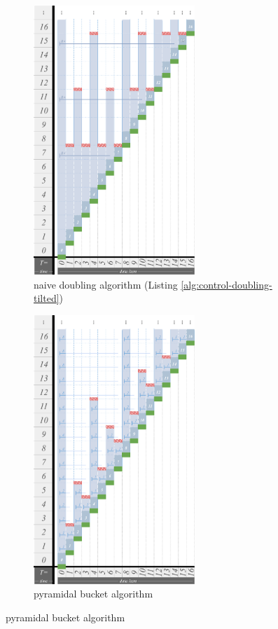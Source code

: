 \begin{figure}
\begin{subfigure}{0.36\linewidth}
\centering
\includegraphics[height=4in]{img/surface-control-tall-zhao-tilted-doubling-naive-desat50}
\centering
\caption{naive doubling algorithm (Listing \ref{alg:control-doubling-tilted})}
\label{fig:surface-control-tilted:naive-doubling}
\end{subfigure}%
\begin{subfigure}{0.32\linewidth}
\centering
\includegraphics[height=4in,trim={2.5cm 0 0 0},clip]{img/surface-control-tall-zhao-desat50}
\centering
\caption{pyramidal bucket algorithm \citep{zhao2005generalized}}
\label{fig:surface-control-tilted:pyrimidal}

\end{subfigure}
\end{figure}
